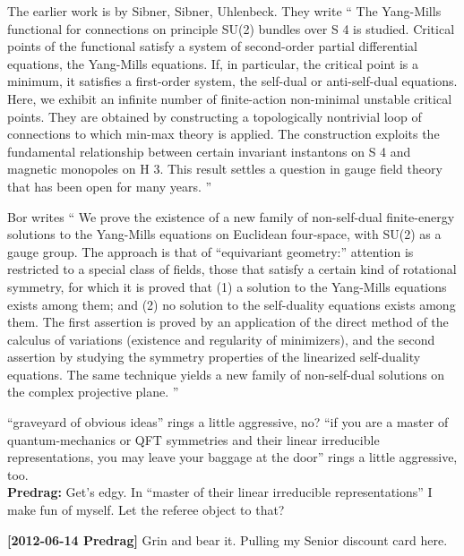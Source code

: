 \begin{description}
The earlier work is by Sibner, Sibner, Uhlenbeck. They
write ``
The Yang-Mills functional for connections on principle SU(2) bundles over
S 4 is studied. Critical points of the functional satisfy a system of
second-order partial differential equations, the Yang-Mills equations. If,
in particular, the critical point is a minimum, it satisfies a
first-order system, the self-dual or anti-self-dual equations. Here, we
exhibit an infinite number of finite-action non-minimal unstable critical
points. They are obtained by constructing a topologically nontrivial loop
of connections to which min-max theory is applied. The construction
exploits the fundamental relationship between certain invariant
instantons on S 4 and magnetic monopoles on H 3. This result settles a
question in gauge field theory that has been open for many years.
''


Bor writes
``
We prove the existence of a new family of non-self-dual finite-energy
solutions to the Yang-Mills equations on Euclidean four-space, with SU(2)
as a gauge group. The approach is that of ``equivariant geometry:''
attention is restricted to a special class of fields, those that satisfy
a certain kind of rotational symmetry, for which it is proved that (1) a
solution to the Yang-Mills equations exists among them; and (2) no
solution to the self-duality equations exists among them. The first
assertion is proved by an application of the direct method of the
calculus of variations (existence and regularity of minimizers), and the
second assertion by studying the symmetry properties of the linearized
self-duality equations. The same technique yields a new family of
non-self-dual solutions on the complex projective plane.
''

\item[2012-04-19 Daniel] ``graveyard of obvious ideas'' rings a little
    aggressive, no? ``if you are a master of quantum-mechanics or QFT symmetries
and their linear irreducible representations, you may leave your
baggage at the door'' rings a little aggressive, too.
\\{\bf Predrag:} Get's edgy. In ``master of their linear irreducible
    representations'' I make fun of myself. Let the referee object to
    that?


{\bf [2012-06-14 Predrag]} Grin and bear it. Pulling my Senior discount
card here.


\end{description}
